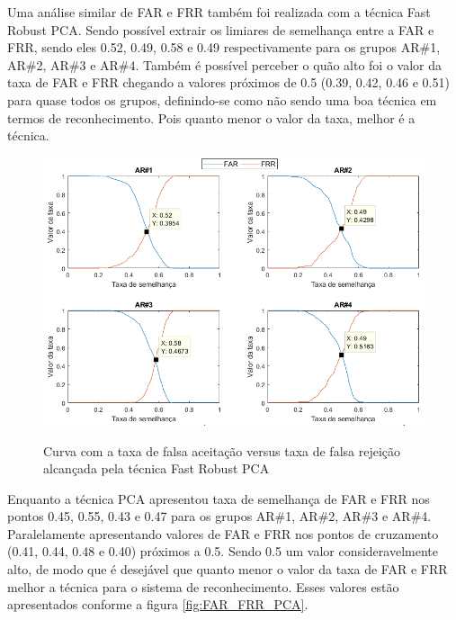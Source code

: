 Uma análise similar de FAR e FRR também foi realizada com a técnica Fast Robust PCA. Sendo possível extrair os limiares de semelhança entre a FAR e FRR, sendo eles 0.52, 0.49, 0.58 e 0.49 respectivamente para os grupos AR\#1, AR\#2, AR\#3 e AR\#4. Também é possível perceber o quão alto foi o valor da taxa de FAR e FRR chegando a valores próximos de 0.5 (0.39, 0.42, 0.46 e 0.51) para quase todos os grupos, definindo-se como não sendo uma boa técnica em termos de reconhecimento. Pois quanto menor o valor da taxa, melhor é a técnica.   

\begin{figure}[H]
\centering
\caption{Curva com a taxa de falsa aceitação versus taxa de falsa rejeição alcançada pela técnica Fast Robust PCA}
\includegraphics[scale=0.55]{imgs4/graficos_FAR_FRR/FRPCA}
\label{fig:FAR_FRR_FRPCA}
\end{figure}

Enquanto a técnica PCA apresentou taxa de semelhança de FAR e FRR nos pontos 0.45, 0.55, 0.43 e 0.47 para os grupos AR\#1, AR\#2, AR\#3 e AR\#4. Paralelamente apresentando valores de FAR e FRR  nos pontos de cruzamento (0.41, 0.44, 0.48 e 0.40) próximos a 0.5. Sendo 0.5 um valor consideravelmente alto, de modo que é desejável que quanto menor o valor da taxa  de FAR e FRR melhor a técnica para o sistema de reconhecimento. Esses valores estão apresentados conforme a figura \ref{fig:FAR_FRR_PCA}.


